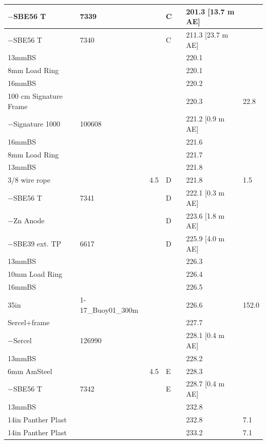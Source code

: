 \documentclass{article}
\begin{document}
\begin{tabularx}{\linewidth}{|X|X|l|l|l|X|l|}
$-$SBE56 T & 7339 &  & C &  & 201.3 [13.7 m AE] &  \\ \hline
$-$SBE56 T & 7340 &  & C &  & 211.3 [23.7 m AE] &  \\ \hline
13mmBS &  &  &  &  & 220.1 &  \\ \hline
8mm Load Ring &  &  &  &  & 220.1 &  \\ \hline
16mmBS &  &  &  &  & 220.2 &  \\ \hline
100 cm Signature Frame &  &  &  &  & 220.3 & 22.8 \\ \hline
$-$Signature 1000 & 100608 &  &  &  & 221.2 [0.9 m AE] &  \\ \hline
16mmBS &  &  &  &  & 221.6 &  \\ \hline
8mm Load Ring &  &  &  &  & 221.7 &  \\ \hline
13mmBS &  &  &  &  & 221.8 &  \\ \hline
3/8 wire rope &  & 4.5 & D &  & 221.8 & 1.5 \\ \hline
$-$SBE56 T & 7341 &  & D &  & 222.1 [0.3 m AE] &  \\ \hline
$-$Zn Anode &  &  & D &  & 223.6 [1.8 m AE] &  \\ \hline
$-$SBE39 ext. TP & 6617 &  & D &  & 225.9 [4.0 m AE] &  \\ \hline
13mmBS &  &  &  &  & 226.3 &  \\ \hline
10mm Load Ring &  &  &  &  & 226.4 &  \\ \hline
16mmBS &  &  &  &  & 226.5 &  \\ \hline
35in & 1-17\_Buoy01\_300m &  &  &  & 226.6 & 152.0 \\ \hline
Sercel+frame &  &  &  &  & 227.7 &  \\ \hline
$-$Sercel & 126990 &  &  &  & 228.1 [0.4 m AE] &  \\ \hline
13mmBS &  &  &  &  & 228.2 &  \\ \hline
6mm AmSteel &  & 4.5 & E &  & 228.3 &  \\ \hline
$-$SBE56 T & 7342 &  & E &  & 228.7 [0.4 m AE] &  \\ \hline
13mmBS &  &  &  &  & 232.8 &  \\ \hline
14in Panther Plast &  &  &  &  & 232.8 & 7.1 \\ \hline
14in Panther Plast &  &  &  &  & 233.2 & 7.1 \\ \hline
\end{tabularx}
\end{document}
